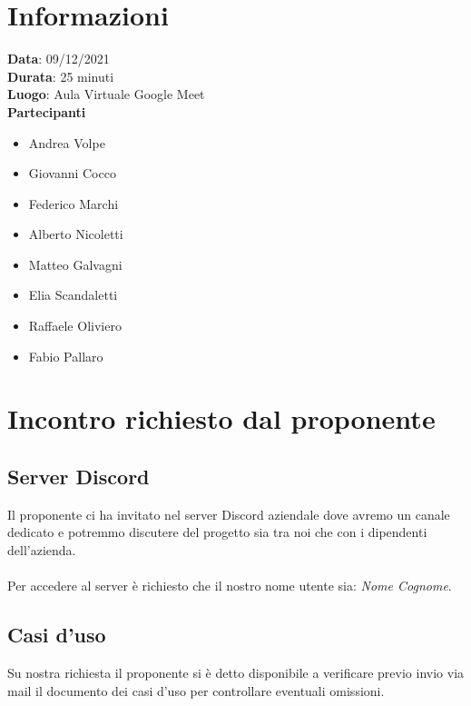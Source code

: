 \documentclass[a4paper, 12pt]{article}
\begin{document}
\makefrontpage

\section{Informazioni}
\textbf{Data}: 09/12/2021\\
\textbf{Durata}: 25 minuti\\
\textbf{Luogo}: Aula Virtuale Google Meet\\

\textbf{Partecipanti}
\begin{itemize}
	\item Andrea Volpe
	\item Giovanni Cocco
	\item Federico Marchi
	\item Alberto Nicoletti
	\item Matteo Galvagni
	\item Elia Scandaletti
	\item Raffaele Oliviero
	\item Fabio Pallaro
\end{itemize}

\section{Incontro richiesto dal proponente}

\subsection{Server Discord}
Il proponente ci ha invitato nel server Discord aziendale dove avremo un canale dedicato e potremmo discutere del progetto sia tra noi che con i dipendenti dell'azienda.\\\\
Per accedere al server è richiesto che il nostro nome utente sia: \emph{Nome Cognome}.

\subsection{Casi d'uso}
Su nostra richiesta il proponente si è detto disponibile a verificare previo invio via mail il documento dei casi d'uso per controllare eventuali omissioni.
\end{document}
